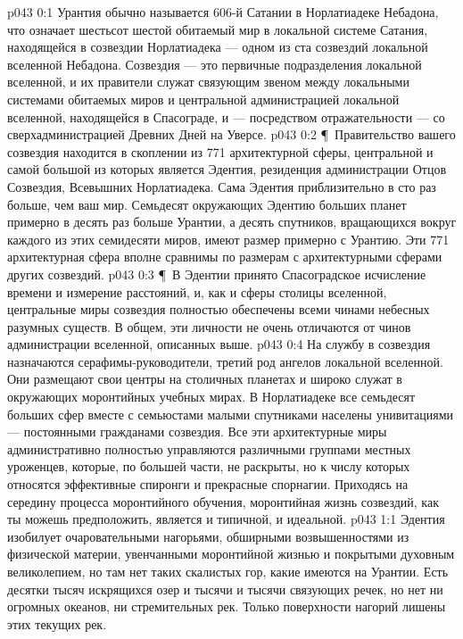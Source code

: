 \vs p043 0:1 Урантия обычно называется 606\hyp{}й Сатании в Норлатиадеке Небадона, что означает шестьсот шестой обитаемый мир в локальной системе Сатания, находящейся в созвездии Норлатиадека --- одном из ста созвездий локальной вселенной Небадона. Созвездия --- это первичные подразделения локальной вселенной, и их правители служат связующим звеном между локальными системами обитаемых миров и центральной администрацией локальной вселенной, находящейся в Спасограде, и --- посредством отражательности --- со сверхадминистрацией Древних Дней на Уверсе.
\vs p043 0:2 \P\ Правительство вашего созвездия находится в скоплении из 771 архитектурной сферы, центральной и самой большой из которых является Эдентия, резиденция администрации Отцов Созвездия, Всевышних Норлатиадека. Сама Эдентия приблизительно в сто раз больше, чем ваш мир. Семьдесят окружающих Эдентию больших планет примерно в десять раз больше Урантии, а десять спутников, вращающихся вокруг каждого из этих семидесяти миров, имеют размер примерно с Урантию. Эти 771 архитектурная сфера вполне сравнимы по размерам с архитектурными сферами других созвездий.
\vs p043 0:3 \P\ В Эдентии принято Спасоградское исчисление времени и измерение расстояний, и, как и сферы столицы вселенной, центральные миры созвездия полностью обеспечены всеми чинами небесных разумных существ. В общем, эти личности не очень отличаются от чинов администрации вселенной, описанных выше.
\vs p043 0:4 На службу в созвездия назначаются серафимы\hyp{}руководители, третий род ангелов локальной вселенной. Они размещают свои центры на столичных планетах и широко служат в окружающих моронтийных учебных мирах. В Норлатиадеке все семьдесят больших сфер вместе с семьюстами малыми спутниками населены унивитациями --- постоянными гражданами созвездия. Все эти архитектурные миры административно полностью управляются различными группами местных уроженцев, которые, по большей части, не раскрыты, но к числу которых относятся эффективные спиронги и прекрасные спорнагии. Приходясь на середину процесса моронтийного обучения, моронтийная жизнь созвездий, как ты можешь предположить, является и типичной, и идеальной.
\vs p043 1:1 Эдентия изобилует очаровательными нагорьями, обширными возвышенностями из физической материи, увенчанными моронтийной жизнью и покрытыми духовным великолепием, но там нет таких скалистых гор, какие имеются на Урантии. Есть десятки тысяч искрящихся озер и тысячи и тысячи связующих речек, но нет ни огромных океанов, ни стремительных рек. Только поверхности нагорий лишены этих текущих рек.
